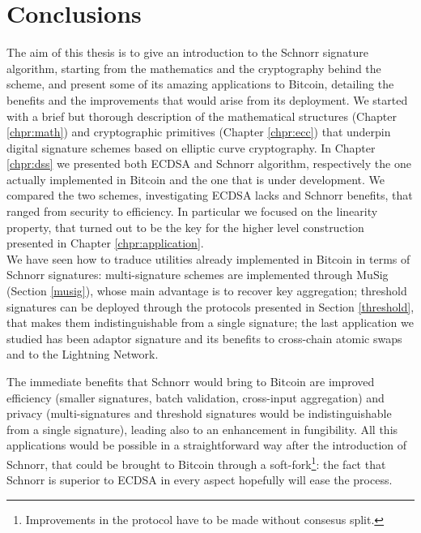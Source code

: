 \chapter{Conclusions}
\label{chpr:conclusion}
The aim of this thesis is to give an introduction to the Schnorr signature algorithm, starting from the mathematics and the cryptography behind the scheme, and present some of its amazing applications to Bitcoin, detailing the benefits and the improvements that would arise from its deployment. We started with a brief but thorough description of the mathematical structures (Chapter \ref{chpr:math}) and cryptographic primitives (Chapter \ref{chpr:ecc}) that underpin digital signature schemes based on elliptic curve cryptography. In Chapter \ref{chpr:dss} we presented both ECDSA and Schnorr algorithm, respectively the one actually implemented in Bitcoin and the one that is under development. We compared the two schemes, investigating ECDSA lacks and Schnorr benefits, that ranged from security to efficiency. In particular we focused on the linearity property, that turned out to be the key for the higher level construction presented in Chapter \ref{chpr:application}.
\\
We have seen how to traduce utilities already implemented in Bitcoin in terms of Schnorr signatures: multi-signature schemes are implemented through MuSig (Section \ref{musig}), whose main advantage is to recover key aggregation; threshold signatures can be deployed through the protocols presented in Section \ref{threshold}, that makes them indistinguishable from a single signature; the last application we studied has been adaptor signature and its benefits to cross-chain atomic swaps and to the Lightning Network.

\bigskip
\noindent
The immediate benefits that Schnorr would bring to Bitcoin are improved efficiency (smaller signatures, batch validation, cross-input aggregation) and privacy (multi-signatures and threshold signatures would be indistinguishable from a single signature), leading also to an enhancement in fungibility. All this applications would be possible in a straightforward way after the introduction of Schnorr, that could be brought to Bitcoin through a soft-fork\footnote{Improvements in the protocol have to be made without consesus split.}: the fact that Schnorr is superior to ECDSA in every aspect hopefully will ease the process.

